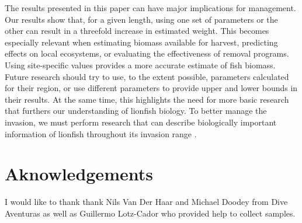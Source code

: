 \documentclass[fleqn,10pt,lineno]{wlpeerj} %
\begin{document}
The results presented in this paper can have major implications for
management. Our results show that, for a given length, using one set of
parameters or the other can result in a threefold increase in estimated
weight. This becomes especially relevant when estimating biomass
available for harvest, predicting effects on local ecosystems, or
evaluating the effectiveness of removal programs. Using site-specific
values provides a more accurate estimate of fish biomass. Future
research should try to use, to the extent possible, parameters
calculated for their region, or use different parameters to provide
upper and lower bounds in their results. At the same time, this
highlights the need for more basic research that furthers our
understanding of lionfish biology. To better manage the invasion, we
must perform research that can describe biologically important
information of lionfish throughout its invasion range
\citep{johnson_2016}.

\section*{Aknowledgements}

I would like to thank thank Nils Van Der Haar and Michael Doodey from
Dive Aventuras as well as Guillermo Lotz-Cador who provided help to
collect samples.


\end{document}
